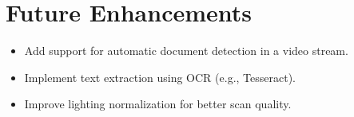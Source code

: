 \documentclass[12pt]{article}
\begin{document}
\section{Future Enhancements}
\begin{itemize}
    \item Add support for automatic document detection in a video stream.
    \item Implement text extraction using OCR (e.g., Tesseract).
    \item Improve lighting normalization for better scan quality.
\end{itemize}
\end{document}
